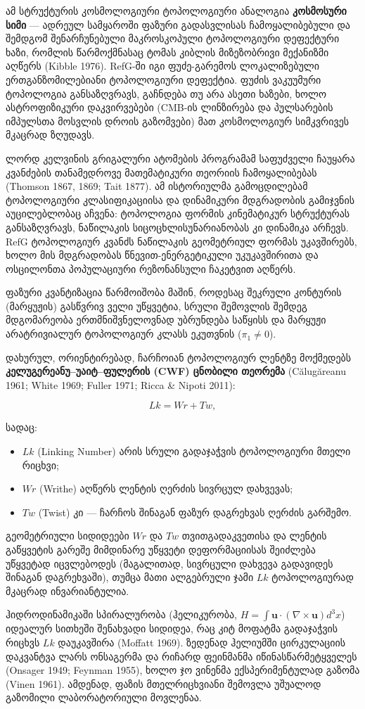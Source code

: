 \documentclass[11pt,a4paper]{article}
\begin{document}
ამ სტრუქტურის კოსმოლოგიური ტოპოლოგიური ანალოგია \textbf{კოსმოსური სიმი} — ადრეულ სამყაროში ფაზური გადასვლისას ჩამოყალიბებული და შემდგომ შენარჩუნებული მაკროსკოპული ტოპოლოგიური დეფექტური ხაზი, რომლის წარმოქმნასაც ტომას კიბლის მიზეზობრივი მექანიზმი აღწერს (Kibble 1976). RefG-ში იგი ფუძე-გარემოს ლოკალიზებული ერთგანზომილებიანი ტოპოლოგიური დეფექტია. ფუძის ვაკუუმური ტოპოლოგია განსაზღვრავს, გაჩნდება თუ არა ასეთი ხაზები, ხოლო ასტროფიზიკური დაკვირვებები (CMB-ის ლინზირება და პულსარების იმპულსთა მოსვლის დროის გაზომვები) მათ კოსმოლოგიურ სიმკვრივეს მკაცრად ზღუდავს.

ლორდ კელვინის გრიგალური ატომების პროგრამამ საფუძველი ჩაუყარა კვანძების თანამედროვე მათემატიკური თეორიის ჩამოყალიბებას (Thomson 1867, 1869; Tait 1877). ამ ისტორიულმა გამოცდილებამ ტოპოლოგიური კლასიფიკაციისა და დინამიკური მდგრადობის გამიჯვნის აუცილებლობაც აჩვენა: ტოპოლოგია ფორმის კინემატიკურ სტრუქტურას განსაზღვრავს, ნაწილაკის სიცოცხლისუნარიანობას კი დინამიკა არჩევს. RefG ტოპოლოგიურ კვანძს ნაწილაკის გეომეტრიულ ფორმას უკავშირებს, ხოლო მის მდგრადობას წნევით-ენერგეტიკული უკუკავშირითა და ოსცილონთა პოპულაციური რეზონანსული ჩაკეტვით აღწერს.

ფაზური კვანტიზაცია წარმოიშობა მაშინ, როდესაც შეკრული კონტურის (მარყუჟის) გასწვრივ ველი უწყვეტია, სრული შემოვლის შემდეგ მდგომარეობა ერთმნიშვნელოვნად უბრუნდება საწყისს და მარყუჟი არატრივიალურ ტოპოლოგიურ კლასს ეკუთვნის ($\pi_1 \neq 0$).

დახურულ, ორიენტირებად, ჩარჩოიან ტოპოლოგიურ ლენტზე მოქმედებს \textbf{კელუგერეანუ–უაიტ–ფულერის (CWF) ცნობილი თეორემა} (Călugăreanu 1961; White 1969; Fuller 1971; Ricca \& Nipoti 2011):

\[
Lk = Wr + Tw,
\]

სადაც:

\begin{itemize}
\item $Lk$ (Linking Number) არის სრული გადაჯაჭვის ტოპოლოგიური მთელი რიცხვი;
\item $Wr$ (Writhe) აღწერს ლენტის ღერძის სივრცულ დახვევას;
\item $Tw$ (Twist) კი — ჩარჩოს შინაგან ფაზურ დაგრეხვას ღერძის გარშემო.

\end{itemize}
გეომეტრიული სიდიდეები $Wr$ და $Tw$ თვითგადაკვეთისა და ლენტის გაწყვეტის გარეშე მიმდინარე უწყვეტი დეფორმაციისას შეიძლება უწყვეტად იცვლებოდეს (მაგალითად, სივრცული დახვევა გადავიდეს შინაგან დაგრეხვაში), თუმცა მათი ალგებრული ჯამი $Lk$ ტოპოლოგიურად მკაცრად ინვარიანტულია.

ჰიდროდინამიკაში სპირალურობა (ჰელიკურობა, $H = \int \mathbf{u} \cdot (\nabla \times \mathbf{u}) d^3x$) იდეალურ სითხეში შენახვადი სიდიდეა, რაც კიტ მოფატმა გადაჯაჭვის რიცხვს $Lk$ დაუკავშირა (Moffatt 1969). ზედენად ჰელიუმში ცირკულაციის დაკვანტვა ლარს ონსაგერმა და რიჩარდ ფეინმანმა იწინასწარმეტყველეს (Onsager 1949; Feynman 1955), ხოლო ჯო ვინენმა ექსპერიმენტულად გაზომა (Vinen 1961). ამდენად, ფაზის მთელრიცხვიანი შემოვლა უშუალოდ გაზომილი ლაბორატორიული მოვლენაა.
\end{document}
